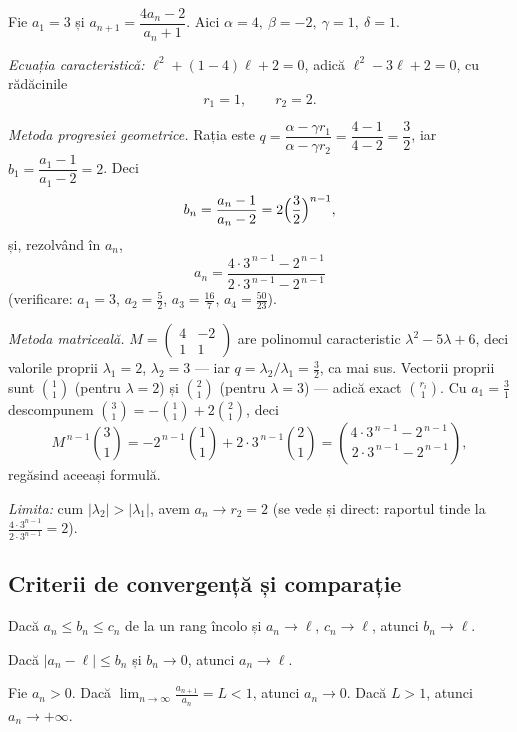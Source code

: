 \begin{exemplu}
Fie $a_1=3$ și $a_{n+1}=\dfrac{4a_n-2}{a_n+1}$. Aici $\alpha=4,\ \beta=-2,\ \gamma=1,\ \delta=1$.

\emph{Ecuația caracteristică:} $\ell^2+(1-4)\ell+2=0$, adică $\ell^2-3\ell+2=0$, cu rădăcinile
\[
r_1=1,\qquad r_2=2 .
\]

\emph{Metoda progresiei geometrice.} Rația este $q=\dfrac{\alpha-\gamma r_1}{\alpha-\gamma r_2}=\dfrac{4-1}{4-2}=\dfrac32$, iar $b_1=\dfrac{a_1-1}{a_1-2}=2$. Deci
\[
b_n=\frac{a_n-1}{a_n-2}=2\Bigl(\frac32\Bigr)^{n-1},
\]
și, rezolvând în $a_n$,
\[
\boxed{\ a_n=\frac{4\cdot 3^{\,n-1}-2^{\,n-1}}{2\cdot 3^{\,n-1}-2^{\,n-1}}\ }
\]
(verificare: $a_1=3$, $a_2=\frac52$, $a_3=\frac{16}{7}$, $a_4=\frac{50}{23}$).

\emph{Metoda matriceală.} $M=\begin{pmatrix}4&-2\\1&1\end{pmatrix}$ are polinomul caracteristic $\lambda^2-5\lambda+6$, deci valorile proprii $\lambda_1=2$, $\lambda_2=3$ --- iar $q=\lambda_2/\lambda_1=\frac32$, ca mai sus. Vectorii proprii sunt $\binom11$ (pentru $\lambda=2$) și $\binom21$ (pentru $\lambda=3$) --- adică exact $\binom{r_i}{1}$. Cu $a_1=\frac31$ descompunem $\binom31=-\binom11+2\binom21$, deci
\[
M^{\,n-1}\binom31=-2^{\,n-1}\binom11+2\cdot 3^{\,n-1}\binom21
=\binom{4\cdot 3^{\,n-1}-2^{\,n-1}}{\,2\cdot 3^{\,n-1}-2^{\,n-1}},
\]
regăsind aceeași formulă.

\emph{Limita:} cum $|\lambda_2|>|\lambda_1|$, avem $a_n\to r_2=2$ (se vede și direct: raportul tinde la $\frac{4\cdot 3^{n-1}}{2\cdot 3^{n-1}}=2$).
\end{exemplu}

\subsection{Criterii de convergență și comparație}

\begin{teorema}
Dacă $a_n\le b_n\le c_n$ de la un rang încolo și $a_n\to\ell$, $c_n\to\ell$, atunci $b_n\to\ell$.
\end{teorema}

\begin{teorema}
Dacă $|a_n-\ell|\le b_n$ și $b_n\to 0$, atunci $a_n\to\ell$.
\end{teorema}

\begin{teorema}
Fie $a_n>0$. Dacă $\displaystyle\lim_{n\to\infty}\frac{a_{n+1}}{a_n}=L<1$, atunci $a_n\to 0$. Dacă $L>1$, atunci $a_n\to+\infty$.
\end{teorema}

